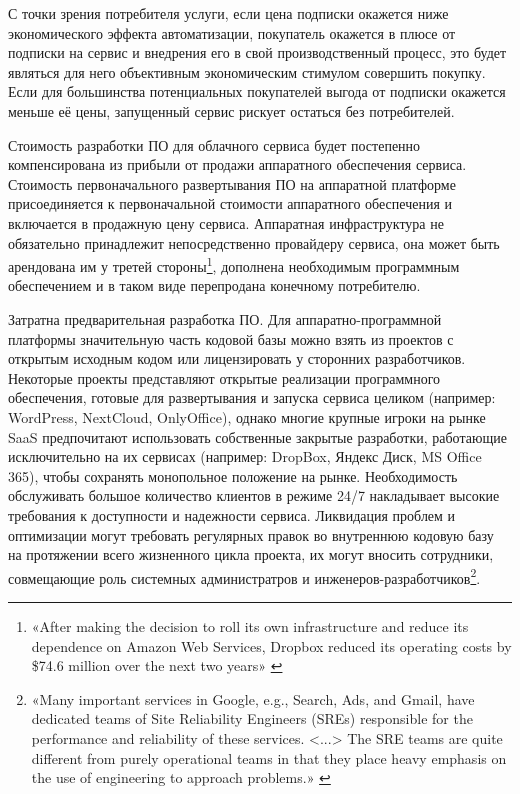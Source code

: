 \documentclass{article}
\begin{document}
С точки зрения потребителя услуги, если цена подписки окажется ниже экономического эффекта автоматизации, покупатель окажется в плюсе от подписки на сервис и внедрения его в свой производственный процесс, это будет являться для него объективным экономическим стимулом совершить покупку. Если для большинства потенциальных покупателей выгода от подписки окажется меньше её цены, запущенный сервис рискует остаться без потребителей.

Стоимость разработки ПО для облачного сервиса будет постепенно компенсирована из прибыли от продажи аппаратного обеспечения сервиса. Стоимость первоначального развертывания ПО на аппаратной платформе присоединяется к первоначальной стоимости аппаратного обеспечения и включается в продажную цену сервиса. Аппаратная инфраструктура не обязательно принадлежит непосредственно провайдеру сервиса, она может быть арендована им у третей стороны\footnote{«After making the decision to roll its own infrastructure and reduce its dependence on Amazon Web Services, Dropbox reduced its operating costs by \$74.6 million over the next two years» \cite{dropboxBuildsOwnInfra}}, дополнена необходимым программным обеспечением и в таком виде перепродана конечному потребителю.

Затратна предварительная разработка ПО. Для аппаратно-программной платформы значительную часть кодовой базы можно взять из проектов с открытым исходным кодом или лицензировать у сторонних разработчиков. Некоторые проекты представляют открытые реализации программного обеспечения, готовые для развертывания и запуска сервиса целиком (например: WordPress, NextCloud, OnlyOffice), однако многие крупные игроки на рынке SaaS предпочитают использовать собственные закрытые разработки, работающие исключительно на их сервисах (например: DropBox, Яндекс Диск, MS Office 365), чтобы сохранять монопольное положение на рынке. Необходимость обслуживать большое количество клиентов в режиме 24/7 накладывает высокие требования к доступности и надежности сервиса. Ликвидация проблем и оптимизации могут требовать регулярных правок во внутреннюю кодовую базу на протяжении всего жизненного цикла проекта, их могут вносить сотрудники, совмещающие роль системных администратров и инженеров-разработчиков\footnote{«Many important services in Google, e.g., Search, Ads, and Gmail, have dedicated teams of Site Reliability Engineers (SREs) responsible for the performance and reliability of these services. <...> The SRE teams are quite different from purely operational teams in that they place heavy emphasis on the use of engineering to approach problems.» \cite{googleSRE}}.
\end{document}
